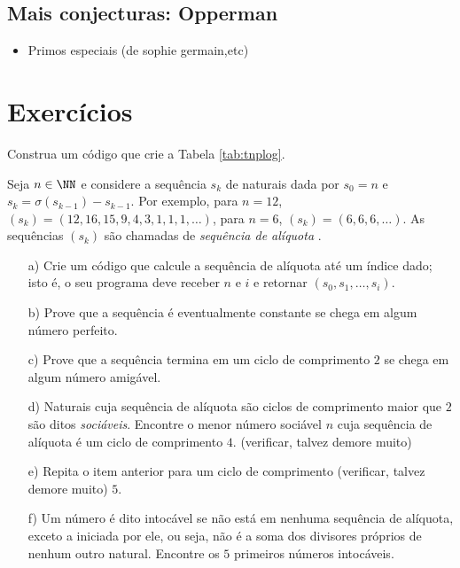 \subsection{Mais conjecturas: Opperman}

\begin{itemize}
  \item Primos especiais (de sophie  germain,etc)
\end{itemize}

\section{Exercícios}

\begin{exercise}
  Construa um código \Sage que crie a Tabela \ref{tab:tnplog}.
\end{exercise}

\begin{exercise}
    Seja $n \in \NN$ e considere a sequência $s_k$ de naturais dada por
    $s_0 = n$ e $s_k = \sigma(s_{k-1}) - s_{k-1}$.
    Por exemplo, para $n = 12$,
    $(s_k) = (12,16,15,9,4,3,1,1,1,\dots)$, 
    para $n = 6$, $(s_k) = (6,6,6,\dots)$.
    As sequências $(s_k)$ são chamadas de \emph{sequência de alíquota}
    .
    \begin{itemize}
      \item[a)] Crie um código que calcule a sequência de alíquota
      até um índice dado; isto é, o seu programa deve receber
      $n$ e $i$ e retornar $(s_0,s_1,\dots,s_i)$.
      \item[b)] Prove que a sequência é eventualmente
      constante se chega em algum número perfeito.
      \item[c)] Prove que a sequência termina em um
      ciclo de comprimento $2$ se chega em algum número
      amigável.
      \item[d)] Naturais cuja sequência de alíquota são ciclos
      de comprimento maior que $2$ são ditos \emph{sociáveis}. Encontre o menor
      número sociável $n$ cuja sequência de alíquota
      é um ciclo de comprimento $4$. {\color{red}(verificar, talvez demore muito)}
      \item[e)] Repita o item anterior para um ciclo de comprimento
        {\color{red}(verificar, talvez demore muito)}
        $5$. %
      \item[f)] Um número é dito intocável
       se não está em nenhuma sequência de alíquota,
      exceto a iniciada por ele, ou seja, não é a soma dos divisores próprios
      de nenhum outro natural. Encontre os $5$ primeiros números
      intocáveis.
    \end{itemize}
\end{exercise}



